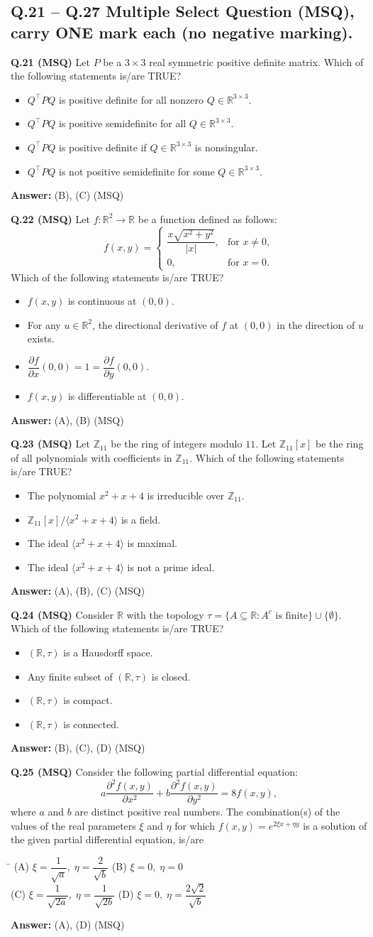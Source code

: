 \documentclass[11pt,a4paper]{article}
\newcommand{\optsfourA}[4]{%
  \begin{tabbing}
    \hspace{0.48\linewidth}\=\kill
    (A) #1 \> (B) #2 \\[2pt]
    (C) #3 \> (D) #4
  \end{tabbing}%
}
\newcommand{\optslistA}[4]{%
  \begin{itemize}
    \setlength{\itemsep}{2pt}\setlength{\parskip}{0pt}
    \item[(A)] #1
    \item[(B)] #2
    \item[(C)] #3
    \item[(D)] #4
  \end{itemize}%
}
\newcommand{\ans}[1]{\textbf{Answer:} #1\par\medskip}
\begin{document}
\subsection*{Q.21 -- Q.27 Multiple Select Question (MSQ), carry ONE mark each (no negative marking).}

\textbf{Q.21 (MSQ)} Let $P$ be a $3 \times 3$ real symmetric positive definite matrix. Which of the following statements is/are TRUE?
\optslistA{$Q^\top P Q$ is positive definite for all nonzero $Q \in \mathbb{R}^{3 \times 3}$.}{$Q^\top P Q$ is positive semidefinite for all $Q \in \mathbb{R}^{3 \times 3}$.}{$Q^\top P Q$ is positive definite if $Q \in \mathbb{R}^{3 \times 3}$ is nonsingular.}{$Q^\top P Q$ is not positive semidefinite for some $Q \in \mathbb{R}^{3 \times 3}$.}
\ans{(B), (C) (MSQ)}

\textbf{Q.22 (MSQ)} Let $f : \mathbb{R}^2 \to \mathbb{R}$ be a function defined as follows:
\[
  f(x, y) = \begin{cases} \dfrac{x\sqrt{x^2 + y^2}}{|x|}, & \text{for } x \ne 0, \\ 0, & \text{for } x = 0. \end{cases}
\]
Which of the following statements is/are TRUE?
\optslistA{$f(x, y)$ is continuous at $(0, 0)$.}{For any $u \in \mathbb{R}^2$, the directional derivative of $f$ at $(0, 0)$ in the direction of $u$ exists.}{$\dfrac{\partial f}{\partial x}(0, 0) = 1 = \dfrac{\partial f}{\partial y}(0, 0)$.}{$f(x, y)$ is differentiable at $(0, 0)$.}
\ans{(A), (B) (MSQ)}

\textbf{Q.23 (MSQ)} Let $\mathbb{Z}_{11}$ be the ring of integers modulo $11$. Let $\mathbb{Z}_{11}[x]$ be the ring of all polynomials with coefficients in $\mathbb{Z}_{11}$. Which of the following statements is/are TRUE?
\optslistA{The polynomial $x^2 + x + 4$ is irreducible over $\mathbb{Z}_{11}$.}{$\mathbb{Z}_{11}[x]/\langle x^2 + x + 4 \rangle$ is a field.}{The ideal $\langle x^2 + x + 4 \rangle$ is maximal.}{The ideal $\langle x^2 + x + 4 \rangle$ is not a prime ideal.}
\ans{(A), (B), (C) (MSQ)}

\textbf{Q.24 (MSQ)} Consider $\mathbb{R}$ with the topology $\tau = \{A \subseteq \mathbb{R} : A^c \text{ is finite}\} \cup \{\emptyset\}$. Which of the following statements is/are TRUE?
\optslistA{$(\mathbb{R}, \tau)$ is a Hausdorff space.}{Any finite subset of $(\mathbb{R}, \tau)$ is closed.}{$(\mathbb{R}, \tau)$ is compact.}{$(\mathbb{R}, \tau)$ is connected.}
\ans{(B), (C), (D) (MSQ)}

\textbf{Q.25 (MSQ)} Consider the following partial differential equation:
\[
  a \frac{\partial^2 f(x, y)}{\partial x^2} + b \frac{\partial^2 f(x, y)}{\partial y^2} = 8 f(x, y),
\]
where $a$ and $b$ are distinct positive real numbers. The combination(s) of the values of the real parameters $\xi$ and $\eta$ for which $f(x, y) = e^{2\xi x + \eta y}$ is a solution of the given partial differential equation, is/are
\optsfourA{$\xi = \dfrac{1}{\sqrt{a}}, \; \eta = \dfrac{2}{\sqrt{b}}$}{$\xi = 0, \; \eta = 0$}{$\xi = \dfrac{1}{\sqrt{2a}}, \; \eta = \dfrac{1}{\sqrt{2b}}$}{$\xi = 0, \; \eta = \dfrac{2\sqrt{2}}{\sqrt{b}}$}
\ans{(A), (D) (MSQ)}
\end{document}
